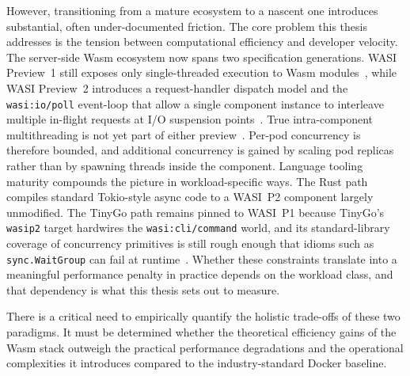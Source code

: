 \begin{sloppypar}
However, transitioning from a mature ecosystem to a nascent one introduces substantial, often under-documented friction. The core problem this thesis addresses is the tension between computational efficiency and developer velocity. The server-side \acs{Wasm} ecosystem now spans two specification generations. \acs{WASI} Preview~1 still exposes only single-threaded execution to \acs{Wasm} modules~\cite{clark2019standardizing, sondell2024performance}, while \acs{WASI} Preview~2 introduces a request-handler dispatch model and the \texttt{wasi:io/poll} event-loop that allow a single component instance to interleave multiple in-flight requests at I/O suspension points~\cite{clark2023preview2, bytecodealliance2024componentmodel}. True intra-component multithreading is not yet part of either preview~\cite{clark2023preview2, bytecodealliance2024componentmodel}. Per-pod concurrency is therefore bounded, and additional concurrency is gained by scaling pod replicas rather than by spawning threads inside the component. Language tooling maturity compounds the picture in workload-specific ways. The Rust path compiles standard Tokio-style async code to a \acs{WASI}~P2 component largely unmodified. The TinyGo path remains pinned to \acs{WASI}~P1 because TinyGo's \texttt{wasip2} target hardwires the \texttt{wasi:cli/command} world, and its standard-library coverage of concurrency primitives is still rough enough that idioms such as \texttt{sync.WaitGroup} can fail at runtime~\cite{liu2025wasmcontainer, kjorveziroski2023serverless}. Whether these constraints translate into a meaningful performance penalty in practice depends on the workload class, and that dependency is what this thesis sets out to measure.
\end{sloppypar}

There is a critical need to empirically quantify the holistic trade-offs of these two paradigms. It must be determined whether the theoretical efficiency gains of the \acs{Wasm} stack outweigh the practical performance degradations and the operational complexities it introduces compared to the industry-standard Docker baseline.

